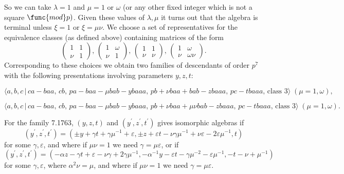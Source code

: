 \documentclass[10pt]{article}
\begin{document}
So we can take $\lambda =1$ and $\mu =1$ or $\omega $ (or any other fixed
integer which is not a square $\func{mod}p)$. Given these values of $\lambda
,\mu $ it turns out that the algebra is terminal unless $\xi =1$ or $\xi
=\mu \nu $. We choose a set of representatives for the equivalence classes
(as defined above) containing matrices of the form%
\[
\left( 
\begin{array}{cc}
1 & 1 \\ 
\nu & 1%
\end{array}%
\right) ,\,\left( 
\begin{array}{cc}
1 & \omega \\ 
\nu & 1%
\end{array}%
\right) ,\,\left( 
\begin{array}{cc}
1 & 1 \\ 
\nu & \nu%
\end{array}%
\right) ,\,\left( 
\begin{array}{cc}
1 & \omega \\ 
\nu & \omega \nu%
\end{array}%
\right) . 
\]%
Corresponding to these choices we obtain two families of descendants of
order $p^{7}$ with the following presentations involving parameters $y,z,t$:

\begin{equation}
\langle a,b,c\,|\,ca-baa,\,cb,\,pa-baa-\mu bab-ybaaa,\,pb+\nu
baa+bab-zbaaa,\,pc-tbaaa,\,\text{class }3\rangle \;(\mu =1,\omega ), 
\tag{7.1763}
\end{equation}

\begin{equation}
\langle a,b,c\,|\,ca-baa,\,cb,\,pa-baa-\mu bab-ybaaa,\,pb+\nu baa+\mu \nu
bab-zbaaa,\,pc-tbaaa,\,\text{class }3\rangle \;(\mu =1,\omega ). 
\tag{7.1764}
\end{equation}

For the family 7.1763, $(y,z,t)$ and $(y^{\prime },z^{\prime },t^{\prime })$
gives isomorphic algebras if%
\[
(y^{\prime },z^{\prime },t^{\prime })=(\pm y+\gamma t+\gamma \mu
^{-1}+\varepsilon ,\pm z+\varepsilon t-\nu \gamma \mu ^{-1}+\nu \varepsilon
-2\varepsilon \mu ^{-1},t) 
\]%
for some $\gamma ,\varepsilon $, and where if $\mu \nu =1$ we need $\gamma
=\mu \varepsilon $, or if%
\[
(y^{\prime },z^{\prime },t^{\prime })=(-\alpha z-\gamma t+\varepsilon -\nu
\gamma +2\gamma \mu ^{-1},-\alpha ^{-1}y-\varepsilon t-\gamma \mu
^{-2}-\varepsilon \mu ^{-1},-t-\nu +\mu ^{-1}) 
\]%
for some $\gamma ,\varepsilon $, where $\alpha ^{2}\nu =\mu $, and where if $%
\mu \nu =1$ we need $\gamma =\mu \varepsilon $.
\end{document}
